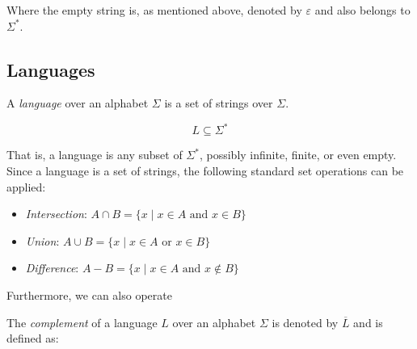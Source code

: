 Where the empty string is, as mentioned above, denoted by $\varepsilon$ and also belongs to $\Sigma^*$.

\subsection*{Languages}

A \emph{language} over an alphabet $\Sigma$ is a set of strings over $\Sigma$.

\[
L \subseteq \Sigma^*
\]

That is, a language is any subset of $\Sigma^*$, possibly infinite, finite, or even empty. \newline
Since a language is a set of strings, the following standard set operations can be applied: %
\begin{itemize}
	\item \emph{Intersection}: $A \cap B = \{ x \mid x \in A \text{ and } x \in B \}$
	\item \emph{Union}: $A \cup B = \{ x \mid x \in A \text{ or } x \in B \}$
	\item \emph{Difference}: $A - B = \{ x \mid x \in A \text{ and } x \notin B \}$
\end{itemize}

Furthermore, we can also operate 


The \emph{complement} of a language $L$ over an alphabet $\Sigma$ is denoted by $\overline{L}$ and is defined as:

